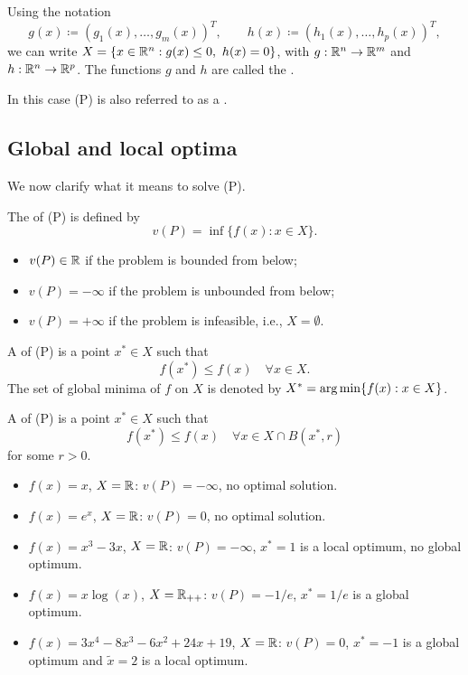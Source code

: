 Using the notation
\[
    g(x) \coloneqq (g_1(x), \dots, g_m(x))^T, \qquad h(x) \coloneqq (h_1(x), \dots, h_p(x))^T,
\]
we can write $X = \{x \in \R^n : g(x) \le 0,\ h(x) = 0\}$, with $g: \mathbb{R}^n \to \mathbb{R}^m$ and $h: \mathbb{R}^n \to \mathbb{R}^p$.
The functions $g$ and $h$ are called the .

\begin{remark}
In this case (P) is also referred to as a .
\end{remark}

\subsection{Global and local optima}

We now clarify what it means to solve (P).

\begin{definition}
The  of (P) is defined by
\[
    v(P) = \inf\{f(x) : x \in X\}.
\]
\begin{itemize}
    \item $v(P) \in \mathbb{R}$ if the problem is bounded from below;
    \item $v(P) = -\infty$ if the problem is unbounded from below;
    \item $v(P) = +\infty$ if the problem is infeasible, i.e., $X = \emptyset$.
\end{itemize}
\end{definition}

\begin{definition}
A  of (P) is a point $x^* \in X$ such that
\[
    f(x^*) \le f(x) \quad \forall x \in X.
\]
The set of global minima of $f$ on $X$ is denoted by $X^* = \operatorname*{arg\,min}\{f(x) : x \in X\}$.
\end{definition}

\begin{definition}
A  of (P) is a point $x^* \in X$ such that
\[
    f(x^*) \le f(x) \quad \forall x \in X \cap B(x^*, r)
\]
for some $r > 0$.
\end{definition}

\begin{example}
\leavevmode
\begin{itemize}
    \item $f(x) = x$, $X = \mathbb{R}$: $v(P) = -\infty$, no optimal solution.
    \item $f(x) = e^x$, $X = \mathbb{R}$: $v(P) = 0$, no optimal solution.
    \item $f(x) = x^3 - 3x$, $X = \mathbb{R}$: $v(P) = -\infty$, $x^* = 1$ is a local optimum, no global optimum.
    \item $f(x) = x \log(x)$, $X = \mathbb{R}_{++}$: $v(P) = -1/e$, $x^* = 1/e$ is a global optimum.
    \item $f(x) = 3x^4 - 8x^3 - 6x^2 + 24x + 19$, $X = \mathbb{R}$: $v(P) = 0$, $x^* = -1$ is a global optimum and $\tilde{x} = 2$ is a local optimum.
\end{itemize}
\end{example}

